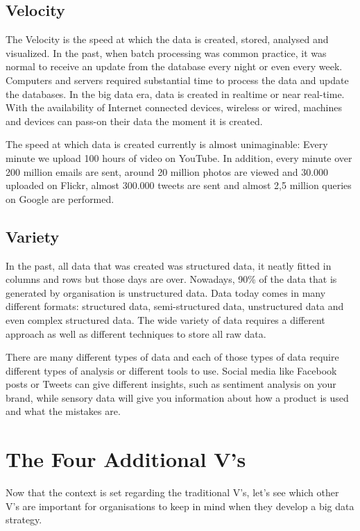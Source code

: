 \subsection{Velocity}
The Velocity is the speed at which the data is created, stored, analysed and visualized. In the past, when batch processing was common practice, it was normal to receive an update from the database every night or even every week. Computers and servers required substantial time to process the data and update the databases. In the big data era, data is created in realtime or near real-time. With the availability of Internet connected devices, wireless or wired, machines and devices can pass-on their data the moment it is created.
\par
The speed at which data is created currently is almost unimaginable: Every minute we upload 100 hours of video on YouTube. In addition, every minute over 200 million emails are sent, around 20 million photos are viewed and 30.000 uploaded on Flickr, almost 300.000 tweets are sent and almost 2,5 million queries on Google are performed.
\subsection{Variety}
In the past, all data that was created was structured data, it neatly fitted in columns and rows but those days are over. Nowadays, 90\% of the data that is generated by organisation is unstructured data. Data today comes in many different formats: structured data, semi-structured data, unstructured data and even complex structured data. The wide variety of data requires a different approach as well as different techniques to store all raw data.
\par
There are many different types of data and each of those types of data require different types of analysis or different tools to use. Social media like Facebook posts or Tweets can give different insights, such as sentiment analysis on your brand, while sensory data will give you information about how a product is used and what the mistakes are.

\section{The Four Additional V’s}
Now that the context is set regarding the traditional V’s, let’s see which other V’s are important for organisations to keep in mind when they develop a big data strategy.
